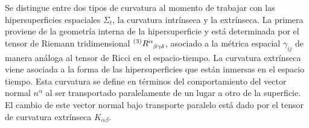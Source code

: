 \documentclass[11pt,twoside,openright,spanish]{report}
\numberwithin{equation}{chapter}
\numberwithin{figure}{chapter}
\numberwithin{table}{chapter}
\begin{document}
Se distingue entre dos tipos de curvatura al momento de trabajar con las hipersuperficies espaciales $\Sigma_t$, la curvatura intrínseca y la extrínseca. La primera proviene de la geometría interna de la hipersuperficie y está determinada por el tensor de Riemann tridimensional $^{(3)}\tensor{R}{^\alpha_\beta_\gamma_\delta}$, asociado a la métrica espacial $\gamma_{ij}$ de manera análoga al tensor de Ricci en el espacio-tiempo. La curvatura extrínseca viene asociada a la forma de las hipersuperficies que están inmersas en el espacio tiempo. Esta curvatura se define en términos del comportamiento del vector normal $n^\alpha$ al ser transportado paralelamente de un lugar a otro de la superficie. El cambio de este vector normal bajo transporte paralelo está dado por el tensor de curvatura extrínseca $K_{\alpha\beta}$.
\end{document}

